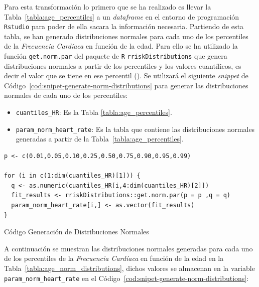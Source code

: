 Para esta transformación lo primero que se ha realizado es llevar la Tabla~\ref{tabla:age_percentiles} a un \textit{dataframe} en el entorno de programación \texttt{Rstudio} para poder de ella sacara la información necesaria. Partiendo de esta tabla, se han generado distribuciones normales para cada uno de los percentiles de la \textit{Frecuencia Cardíaca} en función de la edad. Para ello se ha utilizado la función \texttt{get.norm.par} del paquete de \texttt{R} \texttt{rriskDistributions} que genera distribuciones normales a partir de los percentiles y los valores cuantílicos, es decir el valor que se tiene en ese percentil (\cite{rriskDistributions}). Se utilizará el siguiente \textit{snippet} de Código~\ref{cod:snipet-generate-norm-distributions} para generar las distribuciones normales de cada uno de los percentiles:

\begin{itemize}
    \item \texttt{cuantiles\_HR}: Es la Tabla \ref{tabla:age_percentiles}.
    \item \texttt{param\_norm\_heart\_rate}: Es la tabla que contiene las distribuciones normales generadas a partir de la Tabla~\ref{tabla:age_percentiles}.
\end{itemize}

\begin{code}[H]
\begin{lstlisting}
p <- c(0.01,0.05,0.10,0.25,0.50,0.75,0.90,0.95,0.99)

for (i in c(1:dim(cuantiles_HR)[1])) {
  q <- as.numeric(cuantiles_HR[i,4:dim(cuantiles_HR)[2]])
  fit_results <- rriskDistributions::get.norm.par(p = p ,q = q)
  param_norm_heart_rate[i,] <- as.vector(fit_results)
}
\end{lstlisting}
\caption{Código Generación de Distribuciones Normales}
\label{cod:snipet-generate-norm-distributions}
\end{code}

A continuación se muestran las distribuciones normales generadas para cada uno de los percentiles de la \textit{Frecuencia Cardíaca} en función de la edad en la Tabla~\ref{tabla:age_norm_distributions}, dichos valores se almacenan en la variable \texttt{param\_norm\_heart\_rate} en el Código~\ref{cod:snipet-generate-norm-distributions}:

